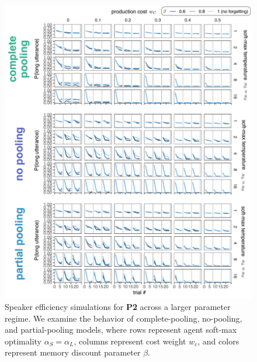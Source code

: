 \documentclass[10pt, man, floatsintext]{apa7}
\begin{document}
 \begin{figure}
\centering
    \includegraphics[scale=.8]{grid_all_models.pdf}
  \caption{Speaker efficiency simulations for \textbf{P2} across a larger parameter regime. We examine the behavior of complete-pooling, no-pooling, and partial-pooling models, where rows represent agent soft-max optimality $\alpha_S = \alpha_L$, columns represent cost weight $w_c$, and colors represent memory discount parameter $\beta$.}
  \label{fig:partnerspecificity_grid}
\end{figure}
\end{document}
